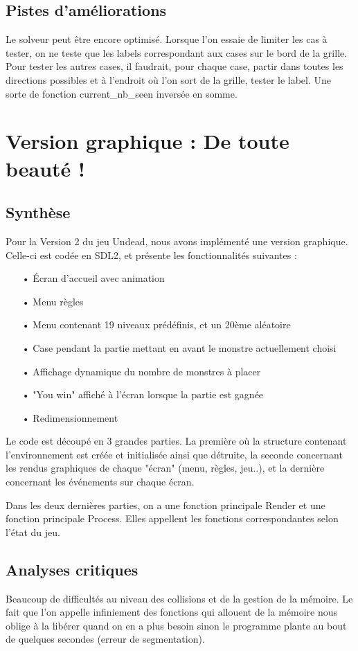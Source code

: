 \documentclass[12pt]{article}
\begin{document}
\subsection{Pistes d'améliorations}
Le solveur peut être encore optimisé. Lorsque l'on essaie de limiter les cas à tester, on ne teste que les labels correspondant aux cases sur le bord de la grille. Pour tester les autres cases, il faudrait, pour chaque case, partir dans toutes les directions possibles et à l'endroit où l'on sort de la grille, tester le label. Une sorte de fonction current\_nb\_seen inversée en somme.

\section{Version graphique : De toute beauté !}
\subsection{Synthèse}
Pour la Version 2 du jeu Undead, nous avons implémenté une version graphique. Celle-ci est codée en SDL2, et présente les fonctionnalités suivantes :

\vspace{5mm}
\begin{itemize}
\item[•] Écran d'accueil avec animation
\item[•] Menu règles
\item[•] Menu contenant 19 niveaux prédéfinis, et un 20ème aléatoire
\item[•] Case pendant la partie mettant en avant le monstre actuellement choisi
\item[•] Affichage dynamique du nombre de monstres à placer
\item[•] "You win" affiché à l'écran lorsque la partie est gagnée
\item[•] Redimensionnement
\end{itemize}

Le code est découpé en 3 grandes parties. La première où la structure contenant l'environnement est créée et initialisée ainsi que détruite, la seconde concernant les rendus graphiques de chaque "écran" (menu, règles, jeu..), et la dernière concernant les événements sur chaque écran.

Dans les deux dernières parties, on a une fonction principale Render et une fonction principale Process. Elles appellent les fonctions correspondantes selon l'état du jeu. 

\subsection{Analyses critiques}
Beaucoup de difficultés au niveau des collisions et de la gestion de la mémoire. Le fait que l'on appelle infiniement des fonctions qui allouent de la mémoire nous oblige à la libérer quand on en a plus besoin sinon le programme plante au bout de quelques secondes (erreur de segmentation). 
\end{document}
